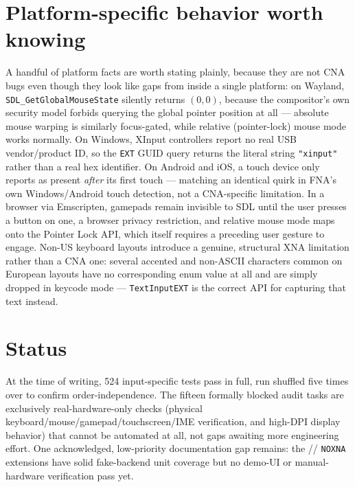 \section{Platform-specific behavior worth knowing}

A handful of platform facts are worth stating plainly, because they are not CNA bugs even
though they look like gaps from inside a single platform: on Wayland,
\texttt{SDL\_GetGlobalMouseState} silently returns $(0,0)$, because the compositor's own
security model forbids querying the global pointer position at all --- absolute mouse
warping is similarly focus-gated, while relative (pointer-lock) mouse mode works normally.
On Windows, XInput controllers report no real USB vendor/product ID, so the \texttt{EXT}
GUID query returns the literal string \texttt{"xinput"} rather than a real hex identifier.
On Android and iOS, a touch device only reports as present \emph{after} its first touch ---
matching an identical quirk in FNA's own Windows/Android touch detection, not a CNA-specific
limitation. In a browser via Emscripten, gamepads remain invisible to SDL until the user
presses a button on one, a browser privacy restriction, and relative mouse mode maps onto the
Pointer Lock API, which itself requires a preceding user gesture to engage. Non-US keyboard
layouts introduce a genuine, structural XNA limitation rather than a CNA one: several
accented and non-ASCII characters common on European layouts have no corresponding
 enum value at all and are simply dropped in keycode mode --- \texttt{TextInputEXT}
is the correct API for capturing that text instead.

\section{Status}

At the time of writing, 524 input-specific tests pass in full, run shuffled five times over
to confirm order-independence. The fifteen formally blocked audit tasks are exclusively
real-hardware-only checks (physical keyboard/mouse/gamepad/touchscreen/IME verification, and
high-DPI display behavior) that cannot be automated at all, not gaps awaiting more
engineering effort. One acknowledged, low-priority documentation gap remains: the
// \texttt{NOXNA} extensions have solid
fake-backend unit coverage but no demo-UI or manual-hardware verification pass yet.
